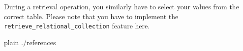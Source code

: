 \documentclass[a4paper,12pt]{report}
\begin{document}
During a retrieval operation, you similarly have to select your values from the correct table.
Please note that you have to implement the \lstinline!retrieve_relational_collection! feature here.









\begin{flushleft}
 
{{{
 {plain}
 {./references}
}}}
\end{flushleft}
\end{document}
